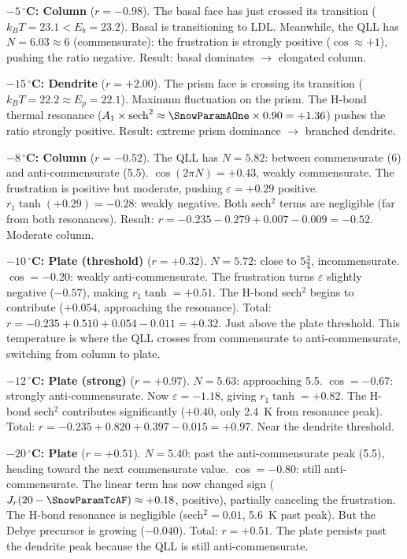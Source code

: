 \documentclass[12pt,letterpaper]{article}
\begin{document}
\textbf{$-5\,{}^\circ$C: Column} ($r = -0.98$).
The basal face has just crossed its transition ($k_BT = 23.1 < E_b = 23.2$).  Basal is transitioning to LDL.
Meanwhile, the QLL has $N = 6.03 \approx 6$ (commensurate): the frustration is strongly positive ($\cos \approx +1$), pushing the ratio negative.
Result: basal dominates $\to$ elongated column.

\textbf{$-15\,{}^\circ$C: Dendrite} ($r = +2.00$).
The prism face is crossing its transition ($k_BT = 22.2 \approx E_p = 22.1$).  Maximum fluctuation on the prism.  The H-bond thermal resonance ($A_1 \times \mathrm{sech}^2 \approx \SnowParamAOne \times 0.90 = +1.36$) pushes the ratio strongly positive.
Result: extreme prism dominance $\to$ branched dendrite.

\textbf{$-8\,{}^\circ$C: Column} ($r = -0.52$).
The QLL has $N = 5.82$: between commensurate (6) and anti-commensurate (5.5).  $\cos(2\pi N) = +0.43$, weakly commensurate.  The frustration is positive but moderate, pushing $\varepsilon = +0.29$ positive.  $r_1 \tanh(+0.29) = -0.28$: weakly negative.  Both sech$^2$ terms are negligible (far from both resonances).  Result: $r = -0.235 - 0.279 + 0.007 - 0.009 = -0.52$.  Moderate column.

\textbf{$-10\,{}^\circ$C: Plate (threshold)} ($r = +0.32$).
$N = 5.72$: close to $5\tfrac{3}{4}$, incommensurate.  $\cos = -0.20$: weakly anti-commensurate.  The frustration turns $\varepsilon$ slightly negative ($-0.57$), making $r_1 \tanh = +0.51$.  The H-bond sech$^2$ begins to contribute ($+0.054$, approaching the resonance).  Total: $r = -0.235 + 0.510 + 0.054 - 0.011 = +0.32$.  Just above the plate threshold.  This temperature is where the QLL crosses from commensurate to anti-commensurate, switching from column to plate.

\textbf{$-12\,{}^\circ$C: Plate (strong)} ($r = +0.97$).
$N = 5.63$: approaching 5.5.  $\cos = -0.67$: strongly anti-commensurate.  Now $\varepsilon = -1.18$, giving $r_1 \tanh = +0.82$.  The H-bond sech$^2$ contributes significantly ($+0.40$, only 2.4~K from resonance peak).  Total: $r = -0.235 + 0.820 + 0.397 - 0.015 = +0.97$.  Near the dendrite threshold.

\textbf{$-20\,{}^\circ$C: Plate} ($r = +0.51$).
$N = 5.40$: past the anti-commensurate peak (5.5), heading toward the next commensurate value.  $\cos = -0.80$: still anti-commensurate.  The linear term has now changed sign ($J_r(20 - \SnowParamTcAF) \approx +0.18$, positive), partially canceling the frustration.  The H-bond resonance is negligible (sech$^2 = 0.01$, 5.6~K past peak).  But the Debye precursor is growing ($-0.040$).  Total: $r = +0.51$.  The plate persists past the dendrite peak because the QLL is still anti-commensurate.
\end{document}
